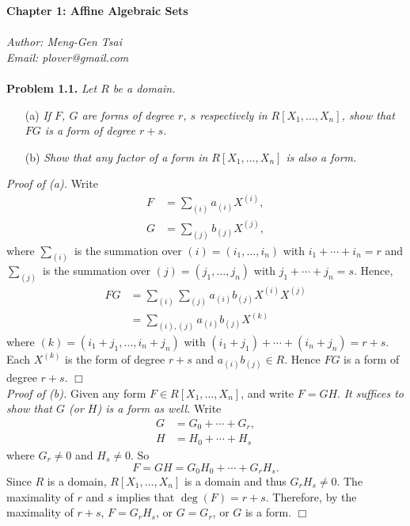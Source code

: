 \documentclass{article}
\begin{document}
\textbf{\Large Chapter 1: Affine Algebraic Sets} \\\\



\emph{Author: Meng-Gen Tsai} \\
\emph{Email: plover@gmail.com} \\\\






\textbf{Problem 1.1.}
\emph{Let $R$ be a domain.}
\begin{enumerate}
\item[(a)]
\emph{If $F$, $G$ are forms of degree $r$, $s$ respectively in $R[X_1,\ldots,X_n]$,
show that $FG$ is a form of degree $r+s$.}
\item[(b)]
\emph{Show that any factor of a form in $R[X_1,\ldots,X_n]$ is also a form. } \\
\end{enumerate}

\emph{Proof of (a).}
Write
\begin{align*}
  F &= \sum_{(i)} a_{(i)} X^{(i)}, \\
  G &= \sum_{(j)} b_{(j)} X^{(j)},
\end{align*}
where $\sum_{(i)}$ is the summation over $(i) = (i_1,\ldots,i_n)$ with $i_1+\cdots+i_n = r$
and $\sum_{(j)}$ is the summation over $(j) = (j_1,\ldots,j_n)$ with $j_1+\cdots+j_n = s$.
Hence,
\begin{align*}
  FG
  &= \sum_{(i)} \sum_{(j)} a_{(i)}b_{(j)} X^{(i)}X^{(j)} \\
  &= \sum_{(i),(j)} a_{(i)}b_{(j)} X^{(k)}
\end{align*}
where $(k) = (i_1+j_1,\ldots,i_n+j_n)$ with $(i_1+j_1)+\cdots+(i_n+j_n) = r+s$.
Each $X^{(k)}$ is the form of degree $r+s$ and $a_{(i)}b_{(j)} \in R$.
Hence $FG$ is a form of degree $r+s$.
$\Box$\\

\emph{Proof of (b).}
Given any form $F \in R[X_1,\ldots,X_n]$, and write $F = GH$.
\emph{It suffices to show that $G$ (or $H$) is a form as well.}
Write
\begin{align*}
  G &= G_0+\cdots+G_r, \\
  H &= H_0+\cdots+H_s
\end{align*}
where $G_r \neq 0$ and $H_s \neq 0$.
So
\[
  F = GH = G_0H_0 + \cdots + G_r H_s.
\]
Since $R$ is a domain, $R[X_1,\ldots,X_n]$ is a domain and thus $G_r H_s \neq 0$.
The maximality of $r$ and $s$ implies that $\deg(F) = r+s$.
Therefore, by the maximality of $r+s$,
$F = G_r H_s$, or $G = G_r$, or $G$ is a form.
$\Box$\\\\



\end{document}
